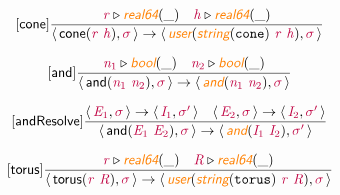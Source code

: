 \documentclass[10pt,leqno,fleqn]{article}
\newcommand{\artVariable}[1]{\mbox{\color{purple}\em #1\/}}
\newcommand{\artConstructor}[1]{\mbox{\sf #1}}
\newcommand{\artCaseInsensitiveLiteral}[1]{\mbox{\tt #1}}
\newcommand{\artSpecial}[1]{\mbox{\color{orange}\sf\em #1}}
\begin{document}
\begin{equation}
\tag*{[\artConstructor{\sf cone}]}
\begin{split}\frac{ \artVariable{r}\triangleright \artSpecial{real64}(\_) \quad  \artVariable{h}\triangleright \artSpecial{real64}(\_) }{\langle\, \artConstructor{\sf cone}(\artVariable{r}\ \artVariable{h}), \artVariable{$\sigma$}\,\rangle \rightarrow \langle\, \artSpecial{user}(\artSpecial{string}(\artCaseInsensitiveLiteral{cone})\ \artVariable{r}\ \artVariable{h}), \artVariable{$\sigma$}\,\rangle }
\end{split}
\end{equation}

\begin{equation}
\tag*{[\artConstructor{\sf and}]}
\begin{split}\frac{ \artVariable{n$_{1}$}\triangleright \artSpecial{bool}(\_) \quad  \artVariable{n$_{2}$}\triangleright \artSpecial{bool}(\_) }{\langle\, \artConstructor{\sf and}(\artVariable{n$_{1}$}\ \artVariable{n$_{2}$}), \artVariable{$\sigma$}\,\rangle \rightarrow \langle\, \artSpecial{and}(\artVariable{n$_{1}$}\ \artVariable{n$_{2}$}), \artVariable{$\sigma$}\,\rangle }
\end{split}
\end{equation}

\begin{equation}
\tag*{[\artConstructor{\sf andResolve}]}
\begin{split}\frac{\langle\, \artVariable{E$_{1}$}, \artVariable{$\sigma$}\,\rangle \rightarrow \langle\, \artVariable{I$_{1}$}, \artVariable{$\sigma$\/$^\prime$}\,\rangle \quad \langle\, \artVariable{E$_{2}$}, \artVariable{$\sigma$}\,\rangle \rightarrow \langle\, \artVariable{I$_{2}$}, \artVariable{$\sigma$\/$^\prime$}\,\rangle }{\langle\, \artConstructor{\sf and}(\artVariable{E$_{1}$}\ \artVariable{E$_{2}$}), \artVariable{$\sigma$}\,\rangle \rightarrow \langle\, \artSpecial{and}(\artVariable{I$_{1}$}\ \artVariable{I$_{2}$}), \artVariable{$\sigma$\/$^\prime$}\,\rangle }
\end{split}
\end{equation}

\begin{equation}
\tag*{[\artConstructor{\sf torus}]}
\begin{split}\frac{ \artVariable{r}\triangleright \artSpecial{real64}(\_) \quad  \artVariable{R}\triangleright \artSpecial{real64}(\_) }{\langle\, \artConstructor{\sf torus}(\artVariable{r}\ \artVariable{R}), \artVariable{$\sigma$}\,\rangle \rightarrow \langle\, \artSpecial{user}(\artSpecial{string}(\artCaseInsensitiveLiteral{torus})\ \artVariable{r}\ \artVariable{R}), \artVariable{$\sigma$}\,\rangle }
\end{split}
\end{equation}
\end{document}
